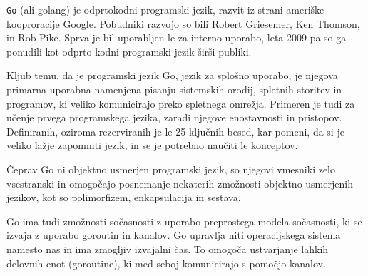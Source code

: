 \documentclass[a4paper, 12pt]{book}
\begin{document}
\verb=Go= (ali golang) je odprtokodni programski jezik, razvit iz strani ameriške kooproracije Google. Pobudniki razvojo so bili Robert Griesemer, Ken Thomson, in Rob Pike. Sprva je bil uporabljen le za interno uporabo, leta 2009 pa so ga ponudili kot odprto kodni programski jezik širši publiki. 
 
Kljub temu, da je programski jezik Go, jezik za splošno uporabo, je njegova primarna uporabna namenjena pisanju sistemskih orodij, spletnih storitev in programov, ki veliko komunicirajo preko  spletnega omrežja. Primeren je tudi za učenje prvega programskega jezika, zaradi njegove enostavnosti in pristopov. Definiranih, oziroma rezerviranih je le 25 ključnih besed, kar pomeni, da si je veliko lažje zapomniti jezik, in se je potrebno naučiti le konceptov.

Čeprav Go ni objektno usmerjen programski jezik, so njegovi vmesniki zelo vsestranski in omogočajo posnemanje nekaterih zmožnosti objektno usmerjenih jezikov, kot so polimorfizem, enkapsulacija in sestava.

Go ima tudi zmožnosti sočasnosti z uporabo preprostega modela sočasnosti, ki se izvaja z uporabo goroutin in kanalov. Go upravlja niti operacijskega sistema namesto nas in ima zmogljiv izvajalni čas. 
To omogoča ustvarjanje lahkih delovnih enot (goroutine), ki med seboj komunicirajo s pomočjo kanalov.
 

 



\end{document}
